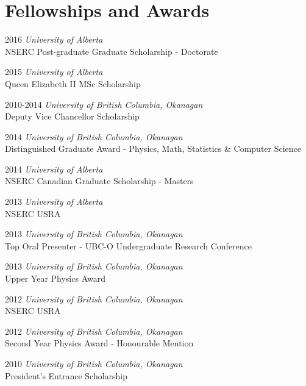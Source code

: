 \documentclass[letterpaper,11pt]{article}
\newlength{\mainindent} \setlength{\mainindent}{12pt}
\newlength{\contentindent} \setlength{\contentindent}{19ex}
\newenvironment{datelist}{
  \begingroup
  \raggedright
  \begin{description}[labelindent=\mainindent,leftmargin=\contentindent,
      style=sameline,font=\normalfont,topsep=0pt,partopsep=0pt,parsep=0pt,
      itemsep=4pt]
}{
  \end{description}
  \endgroup
}
\begin{document}
\section*{Fellowships and Awards}
\begin{datelist}
\item[2016] \emph{University of Alberta} \\ NSERC Post-graduate Graduate Scholarship - Doctorate
\item[2015] \emph{University of Alberta} \\ Queen Elizabeth II MSc Scholarship
\item[2010-2014] \emph{University of British Columbia, Okanagan} \\ Deputy Vice Chancellor Scholarship
\item[2014] \emph{University of British Columbia, Okanagan} \\ Distinguished Graduate Award - Physics, Math, Statistics \& Computer Science
\item[2014] \emph{University of Alberta} \\ NSERC Canadian Graduate Scholarship - Masters
\item[2013] \emph{University of Alberta} \\ NSERC USRA
\item[2013] \emph{University of British Columbia, Okanagan} \\ Top Oral Presenter - UBC-O Undergraduate Research Conference
\item[2013] \emph{University of British Columbia, Okanagan} \\ Upper Year Physics Award
\item[2012] \emph{University of British Columbia, Okanagan} \\ NSERC USRA
\item[2012] \emph{University of British Columbia, Okanagan} \\ Second Year Physics Award - Honourable Mention
\item[2010] \emph{University of British Columbia, Okanagan} \\ President's Entrance Scholarship
\end{datelist}
\end{document}
